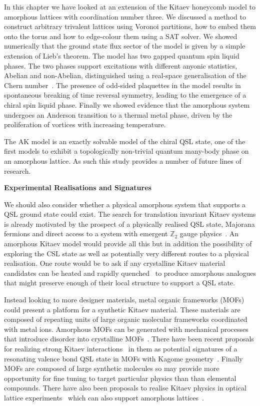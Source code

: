In this chapter we have looked at an extension of the Kitaev honeycomb model to amorphous lattices with coordination number three. We discussed a method to construct arbitrary trivalent lattices using Voronoi partitions, how to embed them onto the torus and how to edge-colour them using a SAT solver. We showed numerically that the ground state flux sector of the model is given by a simple extension of Lieb's theorem. The model has two gapped quantum spin liquid phases. The two phases support excitations with different anyonic statistics, Abelian and non-Abelian, distinguished using a real-space generalisation of the Chern number~\autocite{peru_preprint}. The presence of odd-sided plaquettes in the model results in spontaneous breaking of time reversal symmetry, leading to the emergence of a chiral spin liquid phase. Finally we showed evidence that the amorphous system undergoes an Anderson transition to a thermal metal phase, driven by the proliferation of vortices with increasing temperature.

The AK model is an exactly solvable model of the chiral QSL state, one of the first models to exhibit a topologically non-trivial quantum many-body phase on an amorphous lattice. As such this study provides a number of future lines of research.

\textbf{Experimental Realisations and Signatures}

We should also consider whether a physical amorphous system that supports a QSL ground state could exist. The search for translation invariant Kitaev systems is already motivated by the prospect of a physically realised QSL state, Majorana fermions and direct access to a system with emergent \(\mathbb{Z}_2\) gauge physics~\autocite{TrebstPhysRep2022}. An amorphous Kitaev model would provide all this but in addition the possibility of exploring the CSL state as well as potentially very different routes to a physical realisation. One route would be to ask if any crystalline Kitaev material candidates can be heated and rapidly quenched~\autocite{Weaire1976,Petrakovski1981,Kaneyoshi2018} to produce amorphous analogues that might preserve enough of their local structure to support a QSL state.

Instead looking to more designer materials, metal organic frameworks (MOFs) could present a platform for a synthetic Kitaev material. These materials are composed of repeating units of large organic molecular frameworks coordinated with metal ions. Amorphous MOFs can be generated with mechanical processes that introduce disorder into crystalline MOFs~\autocite{bennett2014amorphous}. There have been recent proposals for realizing strong Kitaev interactions~\autocite{yamadaDesigningKitaevSpin2017} in them as potential signatures of a resonating valence bond QSL state in MOFs with Kagome geometry~\autocite{misumiQuantumSpinLiquid2020}. Finally MOFs are composed of large synthetic molecules so may provide more opportunity for fine tuning to target particular physics than than elemental compounds. There have also been proposals to realise Kitaev physics in optical lattice experiments~\autocite{duanControllingSpinExchange2003,micheliToolboxLatticespinModels2006} which can also support amorphous lattices~\autocite{sadeghiAmorphousTwodimensionalOptical2005}.

